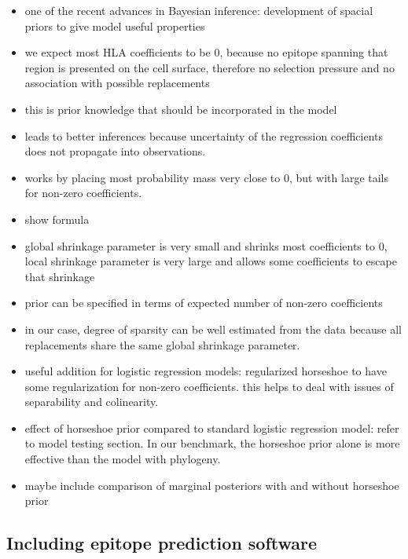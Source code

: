 \documentclass[fleqn,11pt]{SelfArx} %
\begin{document}
\begin{itemize}
  \item one of the recent advances in Bayesian inference: development of spacial priors to give model useful properties
  \item we expect most HLA coefficients to be 0, because no epitope spanning that region is presented on the cell surface, therefore no selection pressure and no association with possible replacements
  \item this is prior knowledge that should be incorporated in the model
  \item leads to better inferences because uncertainty of the regression coefficients does not propagate into observations.
  \item works by placing most probability mass very close to 0, but with large tails for non-zero coefficients.
  \item show formula
  \item global shrinkage parameter is very small and shrinks most coefficients to 0, local shrinkage parameter is very large and allows some coefficients to escape that shrinkage
  \item prior can be specified in terms of expected number of non-zero coefficients
  \item in our case, degree of sparsity can be well estimated from the data because all replacements share the same global shrinkage parameter.
  \item useful addition for logistic regression models: regularized horseshoe to have some regularization for non-zero coefficients. this helps to deal with issues of separability and colinearity.
  \item effect of horseshoe prior compared to standard logistic regression model: refer to model testing section. In our benchmark, the horseshoe prior alone is more effective than the model with phylogeny.
  \item maybe include comparison of marginal posteriors with and without horseshoe prior
\end{itemize}

\subsection*{Including epitope prediction software}
\end{document}
